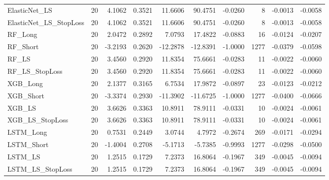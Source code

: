 \begin{tabular}{llrrrrrrrr}
\cline{1-10}
ElasticNet\_LS & 20 & 4.1062 & 0.3521 & 11.6606 & 90.4751 & -0.0260 & 8 & -0.0013 & -0.0058 \\
\cline{1-10}
ElasticNet\_LS\_StopLoss & 20 & 4.1062 & 0.3521 & 11.6606 & 90.4751 & -0.0260 & 8 & -0.0013 & -0.0058 \\
\cline{1-10}
RF\_Long & 20 & 2.0472 & 0.2892 & 7.0793 & 17.4822 & -0.0883 & 16 & -0.0124 & -0.0207 \\
\cline{1-10}
RF\_Short & 20 & -3.2193 & 0.2620 & -12.2878 & -12.8391 & -1.0000 & 1277 & -0.0379 & -0.0598 \\
\cline{1-10}
RF\_LS & 20 & 3.4560 & 0.2920 & 11.8354 & 75.6661 & -0.0283 & 11 & -0.0022 & -0.0060 \\
\cline{1-10}
RF\_LS\_StopLoss & 20 & 3.4560 & 0.2920 & 11.8354 & 75.6661 & -0.0283 & 11 & -0.0022 & -0.0060 \\
\cline{1-10}
XGB\_Long & 20 & 2.1377 & 0.3165 & 6.7534 & 17.9872 & -0.0897 & 23 & -0.0123 & -0.0212 \\
\cline{1-10}
XGB\_Short & 20 & -3.3374 & 0.2930 & -11.3902 & -11.6725 & -1.0000 & 1277 & -0.0400 & -0.0666 \\
\cline{1-10}
XGB\_LS & 20 & 3.6626 & 0.3363 & 10.8911 & 78.9111 & -0.0331 & 10 & -0.0024 & -0.0061 \\
\cline{1-10}
XGB\_LS\_StopLoss & 20 & 3.6626 & 0.3363 & 10.8911 & 78.9111 & -0.0331 & 10 & -0.0024 & -0.0061 \\
\cline{1-10}
LSTM\_Long & 20 & 0.7531 & 0.2449 & 3.0744 & 4.7972 & -0.2674 & 269 & -0.0171 & -0.0294 \\
\cline{1-10}
LSTM\_Short & 20 & -1.4004 & 0.2708 & -5.1713 & -5.7385 & -0.9993 & 1277 & -0.0298 & -0.0500 \\
\cline{1-10}
LSTM\_LS & 20 & 1.2515 & 0.1729 & 7.2373 & 16.8064 & -0.1967 & 349 & -0.0045 & -0.0094 \\
\cline{1-10}
LSTM\_LS\_StopLoss & 20 & 1.2515 & 0.1729 & 7.2373 & 16.8064 & -0.1967 & 349 & -0.0045 & -0.0094 \\
\cline{1-10}
\bottomrule
\end{tabular}
